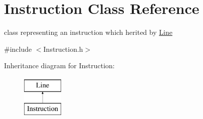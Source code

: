 \hypertarget{class_instruction}{}\section{Instruction Class Reference}
\label{class_instruction}


class representing an instruction which herited by \mbox{\hyperlink{class_line}{Line}}  




{\ttfamily \#include $<$Instruction.\+h$>$}

Inheritance diagram for Instruction\+:\begin{figure}[H]
\begin{center}
\leavevmode
\includegraphics[height=2.000000cm]{class_instruction}
\end{center}
\end{figure}
